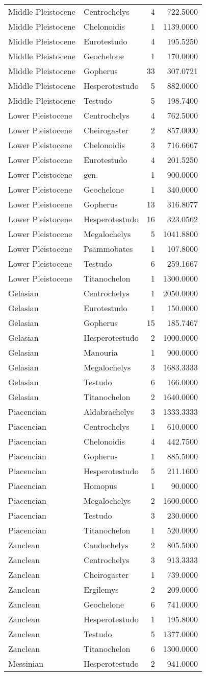 \begin{longtable}[]{@{}llrr@{}}
	Middle Pleistocene & Centrochelys & 4 & 722.5000\tabularnewline
	Middle Pleistocene & Chelonoidis & 1 & 1139.0000\tabularnewline
	Middle Pleistocene & Eurotestudo & 4 & 195.5250\tabularnewline
	Middle Pleistocene & Geochelone & 1 & 170.0000\tabularnewline
	Middle Pleistocene & Gopherus & 33 & 307.0721\tabularnewline
	Middle Pleistocene & Hesperotestudo & 5 & 882.0000\tabularnewline
	Middle Pleistocene & Testudo & 5 & 198.7400\tabularnewline
	Lower Pleistocene & Centrochelys & 4 & 762.5000\tabularnewline
	Lower Pleistocene & Cheirogaster & 2 & 857.0000\tabularnewline
	Lower Pleistocene & Chelonoidis & 3 & 716.6667\tabularnewline
	Lower Pleistocene & Eurotestudo & 4 & 201.5250\tabularnewline
	Lower Pleistocene & gen. & 1 & 900.0000\tabularnewline
	Lower Pleistocene & Geochelone & 1 & 340.0000\tabularnewline
	Lower Pleistocene & Gopherus & 13 & 316.8077\tabularnewline
	Lower Pleistocene & Hesperotestudo & 16 & 323.0562\tabularnewline
	Lower Pleistocene & Megalochelys & 5 & 1041.8800\tabularnewline
	Lower Pleistocene & Psammobates & 1 & 107.8000\tabularnewline
	Lower Pleistocene & Testudo & 6 & 259.1667\tabularnewline
	Lower Pleistocene & Titanochelon & 1 & 1300.0000\tabularnewline
	Gelasian & Centrochelys & 1 & 2050.0000\tabularnewline
	Gelasian & Eurotestudo & 1 & 150.0000\tabularnewline
	Gelasian & Gopherus & 15 & 185.7467\tabularnewline
	Gelasian & Hesperotestudo & 2 & 1000.0000\tabularnewline
	Gelasian & Manouria & 1 & 900.0000\tabularnewline
	Gelasian & Megalochelys & 3 & 1683.3333\tabularnewline
	Gelasian & Testudo & 6 & 166.0000\tabularnewline
	Gelasian & Titanochelon & 2 & 1640.0000\tabularnewline
	Piacencian & Aldabrachelys & 3 & 1333.3333\tabularnewline
	Piacencian & Centrochelys & 1 & 610.0000\tabularnewline
	Piacencian & Chelonoidis & 4 & 442.7500\tabularnewline
	Piacencian & Gopherus & 1 & 885.5000\tabularnewline
	Piacencian & Hesperotestudo & 5 & 211.1600\tabularnewline
	Piacencian & Homopus & 1 & 90.0000\tabularnewline
	Piacencian & Megalochelys & 2 & 1600.0000\tabularnewline
	Piacencian & Testudo & 3 & 230.0000\tabularnewline
	Piacencian & Titanochelon & 1 & 520.0000\tabularnewline
	Zanclean & Caudochelys & 2 & 805.5000\tabularnewline
	Zanclean & Centrochelys & 3 & 913.3333\tabularnewline
	Zanclean & Cheirogaster & 1 & 739.0000\tabularnewline
	Zanclean & Ergilemys & 2 & 209.0000\tabularnewline
	Zanclean & Geochelone & 6 & 741.0000\tabularnewline
	Zanclean & Hesperotestudo & 1 & 195.8000\tabularnewline
	Zanclean & Testudo & 5 & 1377.0000\tabularnewline
	Zanclean & Titanochelon & 6 & 1300.0000\tabularnewline
	Messinian & Hesperotestudo & 2 & 941.0000\tabularnewline

\end{longtable}
